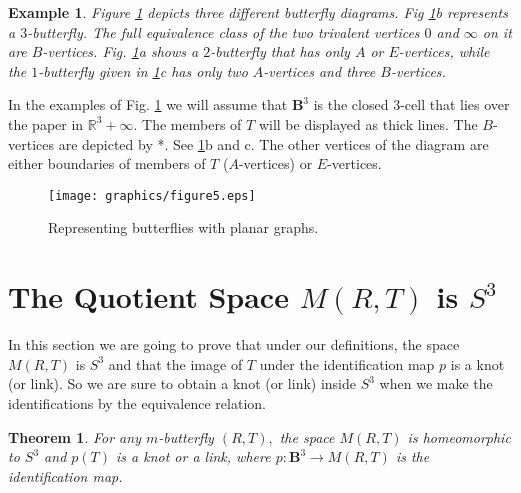\documentclass{amsproc}\usepackage{eurosym}
\theoremstyle{plain}
\newtheorem{example}{Example}
\newtheorem{theorem}{Theorem}
\numberwithin{equation}{section}
\begin{document}
\begin{example}
Figure \ref{fig2} depicts three different butterfly diagrams. Fig \ref{fig2}b
represents a $3$-butterfly. The full equivalence class of the two trivalent
vertices $0$ and $\infty$ on it are $B$-vertices. Fig. \ref{fig2}a shows a
$2$-butterfly that has only $A$ or $E$-vertices, while the $1$-butterfly given
in \ref{fig2}c has only two $A$-vertices and three $B$-vertices.
\end{example}

In the examples of Fig. \ref{fig2} we will assume that $\mathbf{B}^{3}$ is the
closed $3$-cell that lies over the paper in $\mathbb{R}^{3}+\infty$. The
members of $T$ will be displayed as thick lines. The $B$-vertices are depicted
by *. See \ref{fig2}b and c. The other vertices of the diagram are either
boundaries of members of $T$ ($A$-vertices) or $E$-vertices.
\begin{figure}
[h]
\begin{center}
\texttt{[image: graphics/figure5.eps]}\caption{Representing butterflies with planar graphs.}\label{fig2}\end{center}
\end{figure}



\section{\label{S3}The Quotient Space $M(R,T)$ is $S^{3}$}

In this section we are going to prove that under our definitions, the space
$M(R,T)$ is $S^{3}$ and that the image of $T$ under the identification map $p$
is a knot (or link). So we are sure to obtain a knot (or link) inside $S^{3}$
when we make the identifications by the equivalence relation$.$

\begin{theorem}
\label{teos3}For any $m$-butterfly $(R,T),$ the space $M\left(  R,T\right)  $
is homeomorphic to $S^{3}$ and $p\left(  T\right)  $ is a knot or a link,
where $p:\mathbf{B}^{3}\rightarrow M(R,T)$ is the identification map.
\end{theorem}
\end{document}
